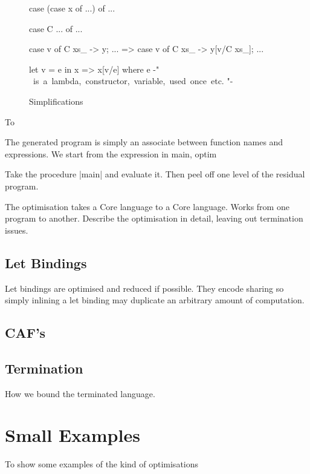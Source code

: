\documentclass{llncs}
\begin{document}
\begin{figure}[tb]
\begin{code}
case (case x of ...) of ...

case C ... of ...

case v of {C xs_ -> y; ...} => case v of {C xs_ -> y[v/C xs_]; ...}

let v = e in x => x[v/e]
   where e {-" \hbox{ is a lambda, constructor, variable, used once etc.} "-}
\end{code}
\caption{Simplifications}
\label{fig:simplify}
\end{figure}

To


The generated program is simply an associate between function names and expressions. We start from the expression in main, optim

Take the procedure |main| and evaluate it. Then peel off one level of the residual program.





The optimisation takes a Core language to a Core language. Works from one program to another. Describe the optimisation in detail, leaving out termination issues.

\subsection{Let Bindings}

Let bindings are optimised and reduced if possible. They encode sharing so simply inlining a let binding may duplicate an arbitrary amount of computation. 

\subsection{CAF's}
\label{sec:caf}



\subsection{Termination}

How we bound the terminated language.

\section{Small Examples}

To show some examples of the kind of optimisations
\end{document}
